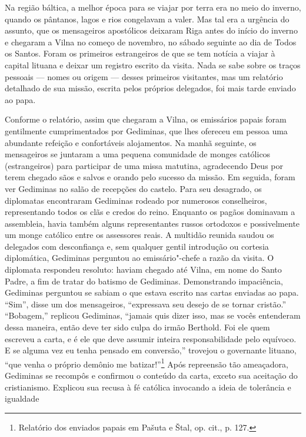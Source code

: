 Na região báltica, a melhor época para se viajar por terra era no meio
do inverno, quando os pântanos, lagos e rios congelavam a valer. Mas tal
era a urgência do assunto, que os mensageiros apostólicos deixaram Riga
antes do início do inverno e chegaram a Vilna no começo de novembro, no
sábado seguinte ao dia de Todos os Santos. Foram os primeiros
estrangeiros de que se tem notícia a viajar à capital lituana e deixar
um registro escrito da visita. Nada se sabe sobre os traços pessoais ---
nomes ou origem --- desses primeiros visitantes, mas um relatório
detalhado de sua missão, escrita pelos próprios delegados, foi mais
tarde enviado ao papa.

Conforme o relatório, assim que chegaram a Vilna, os emissários papais
foram gentilmente cumprimentados por Gediminas, que lhes ofereceu em
pessoa uma abundante refeição e confortáveis alojamentos. Na manhã
seguinte, os mensageiros se juntaram a uma pequena comunidade de monges
católicos (estrangeiros) para participar de uma missa matutina,
agradecendo Deus por terem chegado sãos e salvos e orando pelo sucesso
da missão. Em seguida, foram ver Gediminas no salão de recepções do
castelo. Para seu desagrado, os diplomatas encontraram Gediminas rodeado
por numerosos conselheiros, representando todos os clãs e credos do
reino. Enquanto os pagãos dominavam a assembleia, havia também alguns
representantes russos ortodoxos e possivelmente um monge católico entre
os assessores reais. A multidão reunida saudou os delegados com
desconfiança e, sem qualquer gentil introdução ou cortesia diplomática,
Gediminas perguntou ao emissário"-chefe a razão da visita. O diplomata
respondeu resoluto: haviam chegado até Vilna, em nome do Santo Padre, a
fim de tratar do batismo de Gediminas. Demonstrando impaciência,
Gediminas perguntou se sabiam o que estava escrito nas cartas enviadas
ao papa. ``Sim'', disse um dos mensageiros, ``expressava seu desejo de
se tornar cristão.'' ``Bobagem,'' replicou Gediminas, ``jamais quis
dizer isso, mas se vocês entenderam dessa maneira, então deve ter sido
culpa do irmão Berthold. Foi ele quem escreveu a carta, e é ele que deve
assumir inteira responsabilidade pelo equívoco. E se alguma vez eu tenha
pensado em conversão,'' trovejou o governante lituano, ``que venha o
próprio demônio me batizar!''\footnote{Relatório dos enviados papais em Pašuta e Štal, op. cit., p. 127.}
Após repreensão tão ameaçadora, Gediminas se recompôs e confirmou o
conteúdo da carta, exceto sua aceitação do cristianismo. Explicou sua
recusa à fé católica invocando a ideia de tolerância e igualdade
